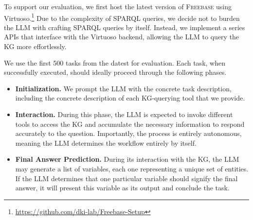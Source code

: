 To support our evaluation, we first host the latest version of \textsc{Freebase} using Virtuoso.\footnote{\url{https://github.com/dki-lab/Freebase-Setup}}
Due to the complexity of SPARQL queries, we decide not to burden the LLM with crafting SPARQL queries by itself.
Instead, we implement a series APIs that interface with the Virtuoso backend, allowing the LLM to query the KG more effortlessly.

We use the first 500 tasks from the datest for evaluation. 
Each task, when successfully executed, should ideally proceed through the following phases.
\begin{itemize}[leftmargin=1.5em,itemsep=0pt,parsep=0.2em,topsep=0.0em,partopsep=0.0em]
\item \textbf{Initialization.} 
We prompt the LLM with the concrete task description, including the concrete description of each KG-querying tool that we provide. 
\item \textbf{Interaction.}
During this phase, the LLM is expected to invoke different tools to access the KG and accumulate the necessary information to respond accurately to the question.
Importantly, the process is entirely autonomous, meaning the LLM determines the workflow entirely by itself.
\item \textbf{Final Answer Prediction.}
During its interaction with the KG, the LLM may generate a list of variables, each one representing a unique set of entities. 
If the LLM determines that one particular variable should signify the final answer, it will present this variable as its output and conclude the task.

\end{itemize}

